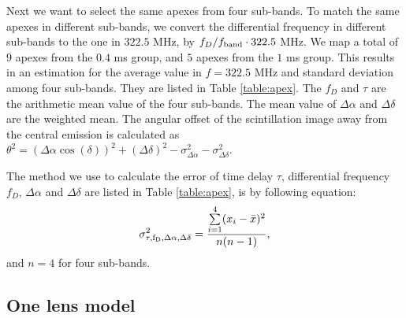 \documentclass[useAMS,usenatbib]{mn2e}
\begin{document}
Next we want to select the same apexes from four sub-bands. To match the same apexes in different sub-bands, we convert the differential frequency in different sub-bands to the one in $322.5$ MHz, by $f_D/f_{\rm band}\cdot322.5$ MHz. We map
a total of $9$ apexes from the $0.4$ ms group, and $5$ apexes from the $1$ ms
group. This results in an estimation
for the average value in $f=322.5$ MHz and standard deviation among four sub-bands. They are listed in Table
\ref{table:apex}. The $f_D$ and $\tau$ are the arithmetic mean value of the four sub-bands. 
The mean value of $\Delta\alpha$ and $\Delta\delta$ are the weighted mean.
The angular offset of the scintillation image away from the central emission is calculated as ${\theta}^2=({\Delta\alpha}\cos(\delta))^2+({\Delta\delta})^2-\sigma^2_{\Delta\alpha}-\sigma^2_{\Delta\delta}$. 

The method we use to calculate the error of time delay $\tau$, differential frequency $f_D$, $\Delta\alpha$ and $\Delta\delta$ are listed in Table \ref{table:apex}, is by following equation:
\begin{equation}
\begin{aligned}
\sigma^2_{\rm \tau, f_D,\Delta\alpha, \Delta\delta} = \frac{\sum\limits^{4}_{i=1}(x_i-\bar{x})^2}{n(n-1)},
\end{aligned}
\end{equation}
and $n=4$ for four sub-bands.


\subsection{One lens model}
\end{document}
